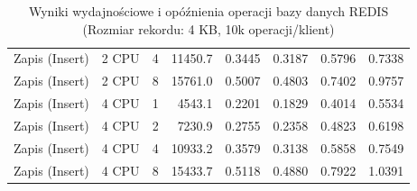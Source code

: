 \begin{table}[ht]
{\begin{tabular}{llcrrrrr}
Zapis (Insert) & 2 CPU & 4 & 11450.7 & 0.3445 & 0.3187 & 0.5796 & 0.7338 \\
Zapis (Insert) & 2 CPU & 8 & 15761.0 & 0.5007 & 0.4803 & 0.7402 & 0.9757 \\
Zapis (Insert) & 4 CPU & 1 & 4543.1 & 0.2201 & 0.1829 & 0.4014 & 0.5534 \\
Zapis (Insert) & 4 CPU & 2 & 7230.9 & 0.2755 & 0.2358 & 0.4823 & 0.6198 \\
Zapis (Insert) & 4 CPU & 4 & 10933.2 & 0.3579 & 0.3138 & 0.5858 & 0.7549 \\
Zapis (Insert) & 4 CPU & 8 & 15433.7 & 0.5118 & 0.4880 & 0.7922 & 1.0391 \\
\bottomrule
\end{tabular}%
}
\caption{Wyniki wydajnościowe i opóźnienia operacji bazy danych REDIS (Rozmiar rekordu: 4 KB, 10k operacji/klient)}
\label{tab:latency_redis_medium_10000}
\end{table}
